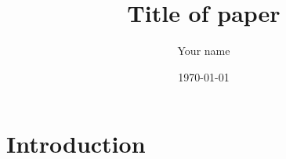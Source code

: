 \documentclass[reprint,preprintnumbers,nofootinbib,amsmath,amssymb,aps,prd,]{revtex4-2}
\begin{document}

\title{Title of paper}


\author{Your name}


\date{\today}

\begin{abstract}
	\lipsum[1]
\end{abstract}


\maketitle


\section{Introduction}
\end{document}
